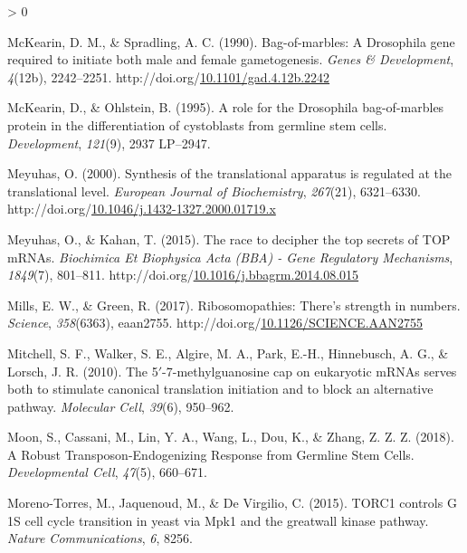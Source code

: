 \documentclass[12pt,oneside]{reedthesis}
\newlength{\cslhangindent}
\newenvironment{CSLReferences}[2] %
 {%
  \setlength{\parindent}{0pt}
  \ifodd #1 \everypar{\setlength{\hangindent}{\cslhangindent}}\ignorespaces\fi
  \ifnum #2 > 0
  \setlength{\parskip}{#2\baselineskip}
  \fi
 }%
 {}
\begin{document}
\begin{CSLReferences}{1}{0}
\leavevmode\hypertarget{ref-McKearin1990e}{}%
McKearin, D. M., \& Spradling, A. C. (1990). Bag-of-marbles: A {Drosophila} gene required to initiate both male and female gametogenesis. \emph{Genes \& Development}, \emph{4}(12b), 2242--2251. http://doi.org/\href{https://doi.org/10.1101/gad.4.12b.2242}{10.1101/gad.4.12b.2242}

\leavevmode\hypertarget{ref-McKearin1995b}{}%
McKearin, D., \& Ohlstein, B. (1995). A role for the {Drosophila} bag-of-marbles protein in the differentiation of cystoblasts from germline stem cells. \emph{Development}, \emph{121}(9), 2937 LP--2947.

\leavevmode\hypertarget{ref-meyuhasSynthesisTranslationalApparatus2000}{}%
Meyuhas, O. (2000). Synthesis of the translational apparatus is regulated at the translational level. \emph{European Journal of Biochemistry}, \emph{267}(21), 6321--6330. http://doi.org/\href{https://doi.org/10.1046/j.1432-1327.2000.01719.x}{10.1046/j.1432-1327.2000.01719.x}

\leavevmode\hypertarget{ref-meyuhasRaceDecipherTop2015}{}%
Meyuhas, O., \& Kahan, T. (2015). The race to decipher the top secrets of {TOP mRNAs}. \emph{Biochimica Et Biophysica Acta (BBA) - Gene Regulatory Mechanisms}, \emph{1849}(7), 801--811. http://doi.org/\href{https://doi.org/10.1016/j.bbagrm.2014.08.015}{10.1016/j.bbagrm.2014.08.015}

\leavevmode\hypertarget{ref-Mills2017c}{}%
Mills, E. W., \& Green, R. (2017). Ribosomopathies: {There}'s strength in numbers. \emph{Science}, \emph{358}(6363), eaan2755. http://doi.org/\href{https://doi.org/10.1126/SCIENCE.AAN2755}{10.1126/SCIENCE.AAN2755}

\leavevmode\hypertarget{ref-Mitchell2010}{}%
Mitchell, S. F., Walker, S. E., Algire, M. A., Park, E.-H., Hinnebusch, A. G., \& Lorsch, J. R. (2010). The 5{\({'}\)}-7-methylguanosine cap on eukaryotic {mRNAs} serves both to stimulate canonical translation initiation and to block an alternative pathway. \emph{Molecular Cell}, \emph{39}(6), 950--962.

\leavevmode\hypertarget{ref-Moon2018a}{}%
Moon, S., Cassani, M., Lin, Y. A., Wang, L., Dou, K., \& Zhang, Z. Z. Z. (2018). A {Robust Transposon}-{Endogenizing Response} from {Germline Stem Cells}. \emph{Developmental Cell}, \emph{47}(5), 660--671.

\leavevmode\hypertarget{ref-Moreno-Torres2015}{}%
Moreno-Torres, M., Jaquenoud, M., \& De Virgilio, C. (2015). {TORC1} controls {G} 1{{S}} cell cycle transition in yeast via {Mpk1} and the greatwall kinase pathway. \emph{Nature Communications}, \emph{6}, 8256.


\end{CSLReferences}
\end{document}
